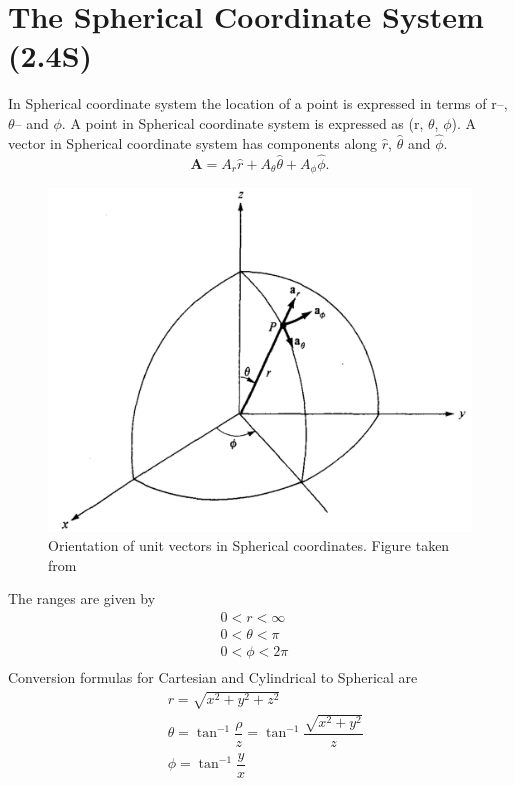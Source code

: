 \documentclass[12pt,a4paper]{article}
\begin{document}
\section{The Spherical Coordinate System (2.4S)}
In Spherical coordinate system the location of a point is expressed in terms of r--, $\theta$-- and $\phi$. A point in Spherical coordinate system is expressed as (r, $\theta$, $\phi$). A vector in Spherical coordinate system has components along $\hat r$, $\hat \theta$ and $\hat \phi$.
\begin{equation}
\textbf{A}=A_r\hat r+A_\theta\hat \theta+ A_\phi\hat \phi.
\end{equation}
\begin{figure}[htb]
\centering
\includegraphics[scale=0.45]{Figure2-4S.png}
\caption{Orientation of unit vectors in Spherical coordinates. Figure taken from~\cite[Figure 2.4, page 33]{Sadiku}}
\label{Unit-vectors-spherical-coordinates}
\end{figure}
The ranges are given by
\begin{equation*}
\begin{split}
0 < r < \infty&\\
0 < \theta < \pi&\\
0 < \phi < 2\pi&\\
\end{split}
\end{equation*}
Conversion formulas for Cartesian and Cylindrical to Spherical are
\begin{equation}
\begin{split}
&r = \sqrt{x^2+y^2+z^2}\\
&\theta = \tan^{-1}{\dfrac{\rho}{z}}=\tan^{-1}{\dfrac{\sqrt{x^2+y^2}}{z}}\\
&\phi = \tan^{-1}{\dfrac{y}{x}}
\end{split}
\end{equation}
\end{document}
